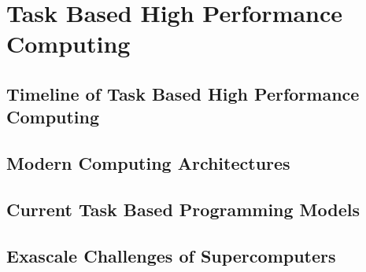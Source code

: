 \chapter{Task Based High Performance Computing}

\section{Timeline of Task Based High Performance Computing}

\section{Modern Computing Architectures}

\section{Current Task Based Programming Models}

\section{Exascale Challenges of Supercomputers}
